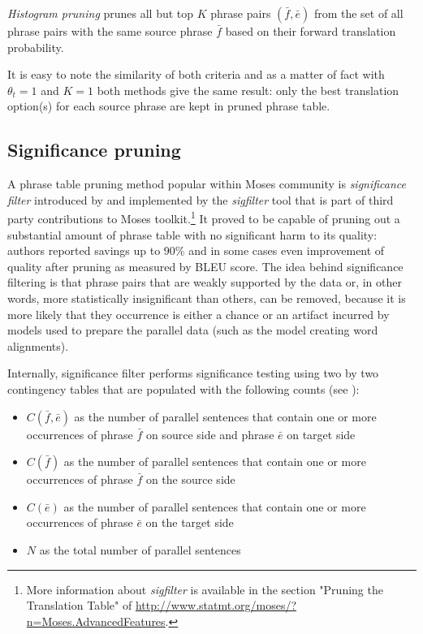 \emph{Histogram pruning} prunes all but top $K$ phrase pairs $(\bar{f},\bar{e})$ from the set
of all phrase pairs with the same source phrase $\bar{f}$ based on their forward translation
probability.

It is easy to note the similarity of both criteria and as a matter of fact with $\theta_{t} = 1$
and $K = 1$ both methods give the same result: only the best translation option(s) for each
source phrase are kept in pruned phrase table.

\subsection{Significance pruning}
\label{sec:significance-pruning}

A phrase table pruning method popular within Moses community is \emph{significance filter}
introduced by \citet{johnson:sigfilter} and implemented by the \emph{sigfilter} tool
that is part of third party contributions to Moses toolkit.\footnote{More information
about \emph{sigfilter} is available in the section "Pruning the Translation Table" of
\url{http://www.statmt.org/moses/?n=Moses.AdvancedFeatures}.}
It proved to be capable of pruning out a substantial amount of phrase table with no
significant harm to its quality: authors reported savings up to 90\% and in some cases
even improvement of quality after pruning as measured by BLEU score.
The idea behind significance filtering is that phrase pairs that are weakly supported
by the data or, in other words, more statistically insignificant than others, can be
removed, because it is more likely that they occurrence is either a chance or an artifact
incurred by models used to prepare the parallel data (such as the model creating word
alignments).

Internally, significance filter performs significance testing using two by two
contingency tables that are populated with the following counts (see
):
\begin{itemize}
  \item $C(\bar{f},\bar{e})$ as the number of parallel sentences that contain one or more
    occurrences of phrase $\bar{f}$ on source side and phrase $\bar{e}$ on target side
  \item $C(\bar{f})$ as the number of parallel sentences that contain one or more
    occurrences of phrase $\bar{f}$ on the source side
  \item $C(\bar{e})$ as the number of parallel sentences that contain one or more
    occurrences of phrase $\bar{e}$ on the target side
  \item $N$ as the total number of parallel sentences
\end{itemize}

